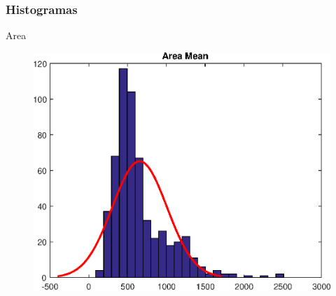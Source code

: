 \documentclass{beamer}
\begin{document}
\begin{frame}
\begin{figure}[H]
\begin{minipage}{.3\textwidth}
  \label{fig:test2}
\end{minipage}
\end{figure}

\end{frame}

\begin{frame}
\frametitle{Histogramas}
Area
\begin{figure}[H]
\centering
  \includegraphics[width=.3\linewidth]{./img/area_mean}
  \label{fig:test1}
\end{figure}%


\end{frame}
\end{document}
